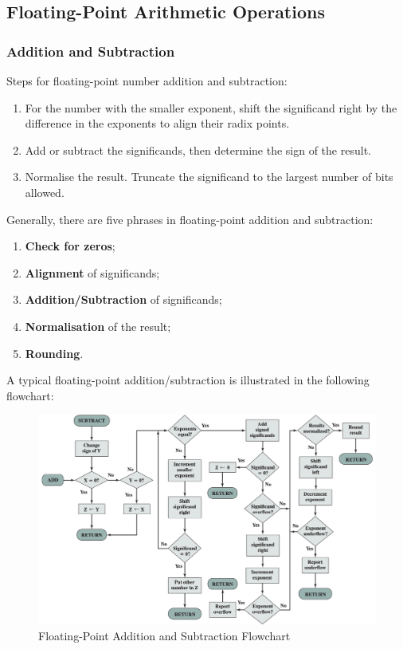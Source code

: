 \subsection{Floating-Point Arithmetic Operations}

\subsubsection{Addition and Subtraction}

Steps for floating-point number addition and subtraction:
\begin{enumerate}
    \item For the number with the smaller exponent, shift the significand right by the difference
        in the exponents to align their radix points.
    \item Add or subtract the significands, then determine the sign of the result.
    \item Normalise the result. Truncate the significand to the largest number of bits allowed.
\end{enumerate}

Generally, there are five phrases in floating-point addition and subtraction:
\begin{enumerate}
    \item \textbf{Check for zeros};
    \item \textbf{Alignment} of significands;
    \item \textbf{Addition/Subtraction} of significands;
    \item \textbf{Normalisation} of the result;
    \item \textbf{Rounding}.
\end{enumerate}

A typical floating-point addition/subtraction is illustrated in the following flowchart:

\begin{figure}[H]
    \centering
    \includegraphics[scale=0.29]{chaps/number-representation/flt-add-sub-flow-chart.png}
    \caption{Floating-Point Addition and Subtraction Flowchart}
\end{figure}

